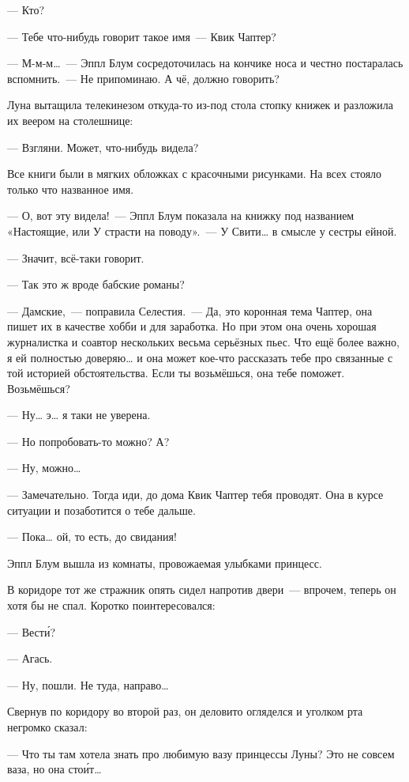 \documentclass[fontsize=11pt,a5paper,titlepage=firstcover]{scrbook}
\begin{document}
--- Кто?

--- Тебе что-нибудь говорит такое имя~--- Квик Чаптер?

--- М-м-м{\ldots}~--- Эппл Блум сосредоточилась на кончике носа и честно постаралась вспомнить.~--- Не припоминаю. А чё, должно говорить?

Луна вытащила телекинезом откуда-то из-под стола стопку книжек и разложила их веером на столешнице:

--- Взгляни. Может, что-нибудь видела?

Все книги были в мягких обложках с красочными рисунками. На всех стояло только что названное имя.

--- О, вот эту видела!~--- Эппл Блум показала на книжку под названием «Настоящие, или У страсти на поводу».~--- У Свити{\ldots} в смысле у сестры ейной.

--- Значит, всё-таки говорит.

--- Так это ж вроде бабские романы?

--- Дамские,~--- поправила Селестия.~--- Да, это коронная тема Чаптер, она пишет их в качестве хобби и для заработка. Но при этом она очень хорошая журналистка и соавтор нескольких весьма серьёзных пьес. Что ещё более важно, я ей полностью доверяю{\ldots} и она может кое-что рассказать тебе про связанные с той историей обстоятельства. Если ты возьмёшься, она тебе поможет. Возьмёшься?

--- Ну{\ldots} э{\ldots} я таки не уверена.

--- Но попробовать-то можно? А?

--- Ну, можно{\ldots}

--- Замечательно. Тогда иди, до дома Квик Чаптер тебя проводят. Она в курсе ситуации и позаботится о тебе дальше.

--- Пока{\ldots} ой, то есть, до свидания!

Эппл Блум вышла из комнаты, провожаемая улыбками принцесс.

В коридоре тот же стражник опять сидел напротив двери~--- впрочем, теперь он хотя бы не спал. Коротко поинтересовался:

--- Вести́?

--- Агась.

--- Ну, пошли. Не туда, направо{\ldots}

Свернув по коридору во второй раз, он деловито огляделся и уголком рта негромко сказал:

--- Что ты там хотела знать про любимую вазу принцессы Луны? Это не совсем ваза, но она стои́т{\ldots}
\end{document}
